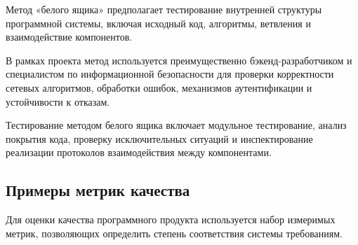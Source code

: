 \documentclass[14pt,a4paper]{extarticle}
\begin{document}
Метод «белого ящика» предполагает тестирование внутренней структуры программной системы, включая исходный код, алгоритмы, ветвления и взаимодействие компонентов.

В рамках проекта метод используется преимущественно бэкенд-разработчиком и специалистом по информационной безопасности для проверки корректности сетевых алгоритмов, обработки ошибок, механизмов аутентификации и устойчивости к отказам.

Тестирование методом белого ящика включает модульное тестирование, анализ покрытия кода, проверку исключительных ситуаций и инспектирование реализации протоколов взаимодействия между компонентами.

\subsection{Примеры метрик качества}

Для оценки качества программного продукта используется набор измеримых метрик, позволяющих определить степень соответствия системы требованиям.
\end{document}

